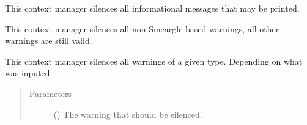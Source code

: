 \documentclass[letterpaper,10pt,english]{sphinxmanual}
\begin{document}

\begin{fulllineitems}
\label{\detokenize{python_docstrings/IfA_Smeargle.meta.errors:IfA_Smeargle.meta.errors.smeargle_silence_info_message}}
This context manager silences all informational messages that may
be printed.

\end{fulllineitems}


\begin{fulllineitems}
\label{\detokenize{python_docstrings/IfA_Smeargle.meta.errors:IfA_Smeargle.meta.errors.smeargle_silence_nonifas_warnings}}
This context manager silences all non-Smeargle based warnings, all
other warnings are still valid.

\end{fulllineitems}


\begin{fulllineitems}
\label{\detokenize{python_docstrings/IfA_Smeargle.meta.errors:IfA_Smeargle.meta.errors.smeargle_silence_specific_warnings}}
This context manager silences all warnings of a given type. Depending
on what was inputed.
\begin{quote}\begin{description}
\item[{Parameters}] \leavevmode
{} () \textendash{} The warning that should be silenced.

\end{description}\end{quote}

\end{fulllineitems}
\end{document}
